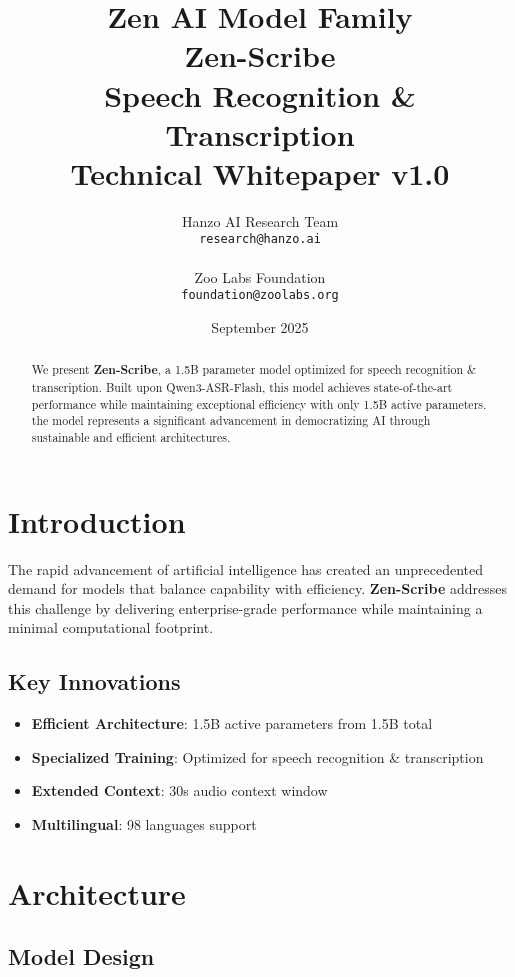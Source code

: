 \documentclass[11pt,a4paper]{article}
\title{
    \vspace{-2cm}
    \Large \textbf{Zen AI Model Family} \\
    \vspace{0.5cm}
    \Huge \textbf{Zen-Scribe} \\
    \vspace{0.3cm}
    \large Speech Recognition & Transcription \\
    \vspace{0.5cm}
    \normalsize Technical Whitepaper v1.0
}
\author{
    Hanzo AI Research Team \\
    \texttt{research@hanzo.ai} \\
    \\
    Zoo Labs Foundation \\
    \texttt{foundation@zoolabs.org}
}
\date{September 2025}
\begin{document}
\maketitle

\begin{abstract}
We present \textbf{Zen-Scribe}, a 1.5B parameter model optimized for speech recognition & transcription. 
Built upon Qwen3-ASR-Flash, this model achieves state-of-the-art performance while maintaining exceptional efficiency 
with only 1.5B active parameters. the model represents a significant advancement in democratizing AI through sustainable and efficient architectures.
\end{abstract}

\tableofcontents
\newpage

\section{Introduction}

The rapid advancement of artificial intelligence has created an unprecedented demand for models that balance capability with efficiency. 
\textbf{Zen-Scribe} addresses this challenge by delivering enterprise-grade performance while maintaining a minimal computational footprint.

\subsection{Key Innovations}
\begin{itemize}
    \item \textbf{Efficient Architecture}: 1.5B active parameters from 1.5B total
    \item \textbf{Specialized Training}: Optimized for speech recognition & transcription
    \item \textbf{Extended Context}: 30s audio context window
    
    
    \item \textbf{Multilingual}: 98 languages support
\end{itemize}

\section{Architecture}

\subsection{Model Design}
\end{document}
